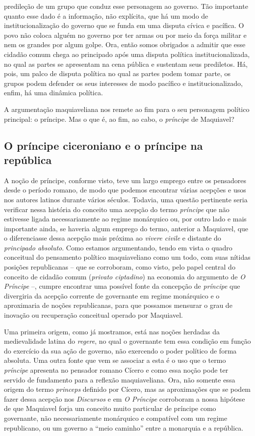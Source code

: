 predileção de um grupo que conduz esse personagem ao governo. Tão
importante quanto esse dado é a informação, não explícita, que há um
modo de institucionalização do governo que se funda em uma disputa
cívica e pacífica. O povo não coloca alguém no governo por ter armas ou
por meio da força militar e nem os grandes por algum golpe. Ora, então
somos obrigados a admitir que esse cidadão comum chega ao principado
após uma disputa política institucionalizada, no qual as partes se
apresentam na cena pública e sustentam seus prediletos. Há, pois, um
palco de disputa política no qual as partes podem tomar parte, os grupos
podem defender os seus interesses de modo pacífico e institucionalizado,
enfim, há uma dinâmica política.

A argumentação maquiaveliana nos remete ao fim para o seu personagem
político principal: o príncipe. Mas o que é, ao fim, ao cabo, o
\emph{príncipe} de Maquiavel?

\subsection{O príncipe ciceroniano e o príncipe na república}

A noção de príncipe, conforme visto, teve um largo emprego entre os
pensadores desde o período romano, de modo que podemos encontrar várias
acepções e usos nos autores latinos durante vários séculos. Todavia, uma
questão pertinente seria verificar nessa história do conceito uma
acepção do termo \emph{príncipe} que não estivesse ligada
necessariamente ao regime monárquico ou, por outro lado e mais
importante ainda, se haveria algum emprego do termo, anterior a
Maquiavel, que o diferenciasse dessa acepção mais próxima ao
\emph{vivere civile} e distante do \emph{principado absoluto}. Como
estamos argumentando, tendo em vista o quadro conceitual do pensamento
político maquiaveliano como um todo, com suas nítidas posições
republicanas -- que se corroboram, como visto, pelo papel central do
conceito de cidadão comum (\emph{privato ciptadino}) na economia do
argumento de \emph{O Príncipe} --, cumpre encontrar uma possível fonte
da concepção de \emph{príncipe} que divergiria da acepção corrente de
governante em regime monárquico e o aproximaria de noções republicanas,
para que possamos mensurar o grau de inovação ou recuperação conceitual
operado por Maquiavel.

Uma primeira origem, como já mostramos, está nas noções herdadas da
medievalidade latina do \emph{regere}, no qual o governante tem essa
condição em função do exercício da sua ação de governo, não exercendo o
poder político de forma absoluta. Uma outra fonte que vem se associar a
esta é o uso que o termo \emph{príncipe} apresenta no pensador romano
Cícero e como essa noção pode ter servido de fundamento para a reflexão
maquiaveliana. Ora, não somente essa origem do termo \emph{princeps}
definido por Cícero, mas as aproximações que se podem fazer dessa
acepção nos \emph{Discursos} e em \emph{O Príncipe} corroboram a nossa
hipótese de que Maquiavel forja um conceito muito particular de príncipe
como governante, não necessariamente monárquico e compatível com um
regime republicano, ou um governo a ``meio caminho'' entre a monarquia e
a república.

